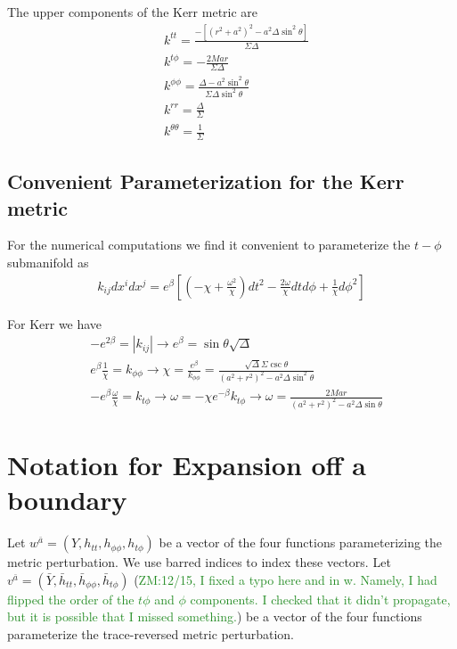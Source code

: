 \documentclass[aps,prd,amsmath,showpacs,amssymb,superscriptaddress,nofootinbib,longbibliography,eqsecnum,preprintnumbers]{revtex4-1}
\newcommand{\zach}[1]{\textcolor{ForestGreen}{#1}}
\begin{document}
The upper components of the Kerr metric are
\begin{align}
&k^{tt}=\frac{-[(r^2+a^2)^2-a^2\Delta \sin^2\theta]}{\Sigma \Delta} \nonumber \\
&k^{t\phi}=-\frac{2Mar}{\Sigma \Delta} \nonumber \\
&k^{\phi\phi}=\frac{\Delta -a^2\sin^2\theta}{\Sigma \Delta \sin^2\theta} \nonumber \\
&k^{rr}=\frac{\Delta}{\Sigma} \nonumber \\
&k^{\theta \theta}=\frac{1}{\Sigma}
\end{align}

\subsection{Convenient Parameterization for the Kerr metric}

For the numerical computations we find it convenient to parameterize the $t-\phi$ submanifold as 
\begin{align}
k_{ij}dx^idx^j=e^{\beta}\left[(-\chi+\frac{\omega^2}{\chi})dt^2-\frac{2\omega}{\chi}dtd\phi +\frac{1}{\chi}d\phi^2\right]
\end{align}

For Kerr we have 
\begin{align}
&-e^{2\beta}=|k_{ij}|\to e^\beta =\sin\theta \sqrt{\Delta} \nonumber \\
&e^\beta\frac{1}{\chi}=k_{\phi\phi}\to \chi =\frac{e^\beta}{k_{\phi\phi}}=\frac{\sqrt{\Delta}\Sigma \csc{\theta}}{(a^2+r^2)^2-a^2\Delta \sin^2\theta} \nonumber \\
&-e^\beta\frac{\omega}{\chi}=k_{t\phi}\to \omega=-\chi e^{-\beta}k_{t\phi} \to \omega =\frac{2Mar}{(a^2+r^2)^2-a^2\Delta \sin\theta}
\end{align}

\section{Notation for Expansion off a boundary}
\label{sec:expnot}

Let $w^{\bar{a}}=(Y,h_{tt},h_{\phi\phi},h_{t\phi})$ be a vector of the four functions parameterizing the metric perturbation. 
We use barred indices to index these vectors. Let $v^{\bar{a}}=(\bar Y,\bar h_{tt},\bar h_{\phi\phi},\bar h_{t\phi})$ (\zach{ZM:12/15, I fixed a typo here and in w. Namely, I had flipped the order of the $t\phi$ and $\phi$ components. I checked that it didn't propagate, but it is possible that I missed something.}) be a vector of the four functions parameterize the trace-reversed metric perturbation.
\end{document}
